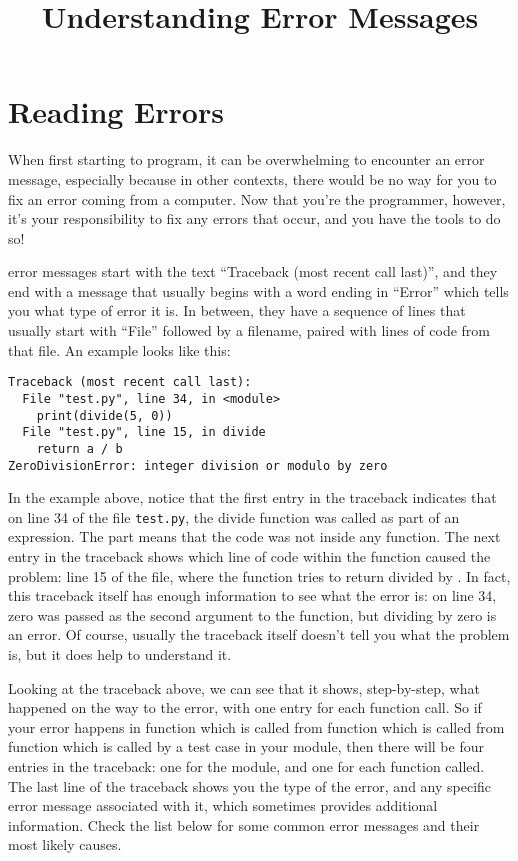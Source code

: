 \documentclass{handout}
\title{Understanding Error Messages}
\begin{document}
\section{Reading Errors}

When first starting to program, it can be overwhelming to encounter an error message, especially because in other contexts, there would be no way for you to fix an error coming from a computer. Now that you're the programmer, however, it's your responsibility to fix any errors that occur, and you have the tools to do so!

\python error messages start with the text ``Traceback (most recent call last)'', and they end with a message that usually begins with a word ending in ``Error'' which tells you what type of error it is. In between, they have a sequence of lines that usually start with ``File'' followed by a filename, paired with lines of code from that file. An example looks like this:

\begin{lstlisting}
Traceback (most recent call last):
  File "test.py", line 34, in <module>
    print(divide(5, 0))
  File "test.py", line 15, in divide
    return a / b
ZeroDivisionError: integer division or modulo by zero
\end{lstlisting}

In the example above, notice that the first entry in the traceback indicates that on line 34 of the file \texttt{test.py}, the divide function was called as part of an expression. The  part means that the code was not inside any function. The next entry in the traceback shows which line of code within the  function caused the problem: line 15 of the file, where the  function tries to return  divided by . In fact, this traceback itself has enough information to see what the error is: on line 34, zero was passed as the second argument to the  function, but dividing by zero is an error. Of course, usually the traceback itself doesn't tell you what the problem is, but it does help to understand it.

Looking at the traceback above, we can see that it shows, step-by-step, what happened on the way to the error, with one entry for each function call. So if your error happens in function  which is called from function  which is called from function  which is called by a test case in your module, then there will be four entries in the traceback: one for the module, and one for each function called. The last line of the traceback shows you the type of the error, and any specific error message associated with it, which sometimes provides additional information. Check the list below for some common error messages and their most likely causes.
\end{document}
